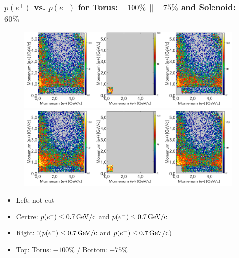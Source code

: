 \documentclass[xcolor=table, xcolor=dvipsnames]{beamer}
\begin{document}
\begin{frame}
        \frametitle{$p(e^+)$ vs. $p(e^-)$ for Torus: $-100\%$ || $-75\%$ and Solenoid: $60\%$}
	\footnotesize
        \begin{figure}
          \includegraphics[width=1.0\textwidth,height=0.2\textwidth]{triggerStudies_Tor1_cut07_pEP_vs_pEM.png}\\
           \includegraphics[width=1.0\textwidth,height=0.2\textwidth]{triggerStudies_Tor075_cut07_pEP_vs_pEM.png}
        \end{figure}
        
        \begin{itemize}
          \item Left: not cut 
          \item Centre: $p(e^+) \le 0.7\,\rm{GeV/c}$ and $p(e^-) \le 0.7\,\rm{GeV/c}$ 
          \item  Right: !($p(e^+) \le 0.7\,\rm{GeV/c}$ and $p(e^-) \le 0.7\,\rm{GeV/c}$)
          \item Top: Torus: $-100\%$ / Bottom: $-75\%$
        \end{itemize}
      \end{frame}
      
\end{document}
